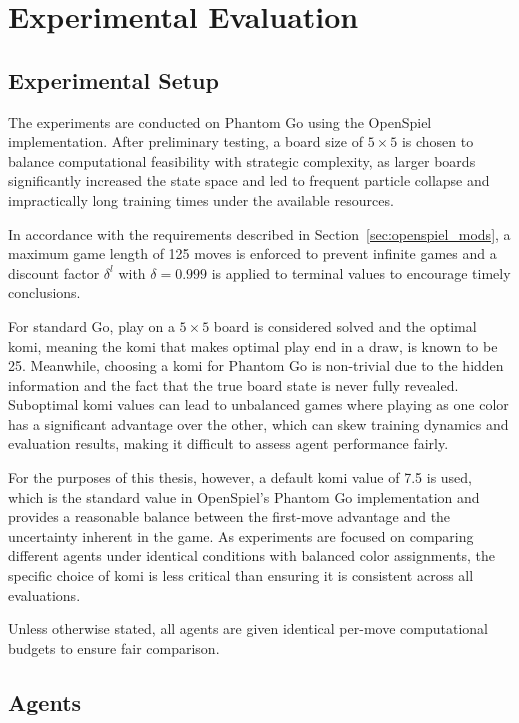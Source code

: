 \documentclass[12pt,oneside,openright]{article}
\begin{document}
\section{Experimental Evaluation}

\subsection{Experimental Setup}

The experiments are conducted on Phantom Go using the OpenSpiel implementation.
After preliminary testing, a board size of $5 \times 5$ is chosen to balance computational feasibility with strategic complexity, as larger boards significantly increased the state space and led to frequent particle collapse and impractically long training times under the available resources.

In accordance with the requirements described in Section~\ref{sec:openspiel_mods},
a maximum game length of 125 moves is enforced to prevent infinite games and a discount factor $\delta^l$ with  $\delta = 0.999$ is applied to terminal values to encourage timely conclusions.

For standard Go, play on a $5 \times 5$ board is considered solved and the optimal komi, meaning the komi that makes optimal play end in a draw, is known to be 25\cite{vanderWerf2003solved}.
Meanwhile, choosing a komi for Phantom Go is non-trivial due to the hidden information and the fact that the true board state is never fully revealed.
Suboptimal komi values can lead to unbalanced games where playing as one color has a significant advantage over the other, which can skew training dynamics and evaluation results, making it difficult to assess agent performance fairly.

For the purposes of this thesis, however, a default komi value of 7.5 is used, which is the standard value in OpenSpiel's Phantom Go implementation and provides a reasonable balance between the first-move advantage and the uncertainty inherent in the game.
As experiments are focused on comparing different agents under identical conditions with balanced color assignments, the specific choice of komi is less critical than ensuring it is consistent across all evaluations.

Unless otherwise stated, all agents are given identical per-move computational budgets to ensure fair comparison.

\subsection{Agents}
\end{document}
